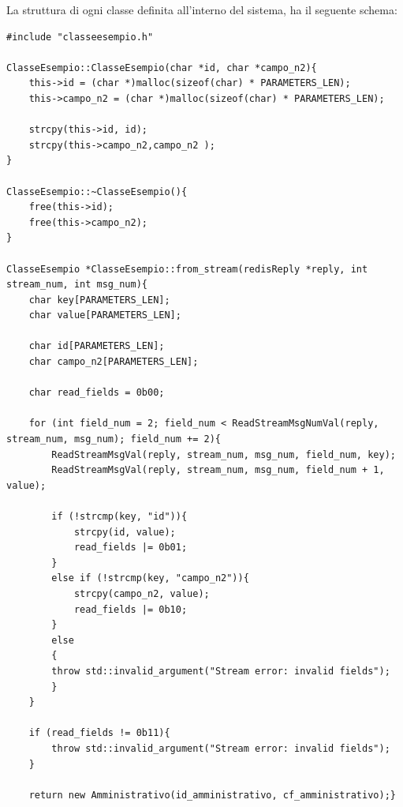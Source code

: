 \documentclass[12pt]{report}
\begin{document}
    La struttura di ogni classe definita all'interno del sistema, ha il seguente schema:
    \begin{lstlisting}
#include "classeesempio.h"

ClasseEsempio::ClasseEsempio(char *id, char *campo_n2){
    this->id = (char *)malloc(sizeof(char) * PARAMETERS_LEN);
    this->campo_n2 = (char *)malloc(sizeof(char) * PARAMETERS_LEN);

    strcpy(this->id, id);
    strcpy(this->campo_n2,campo_n2 );
}

ClasseEsempio::~ClasseEsempio(){
    free(this->id);
    free(this->campo_n2);
}

ClasseEsempio *ClasseEsempio::from_stream(redisReply *reply, int stream_num, int msg_num){
    char key[PARAMETERS_LEN];
    char value[PARAMETERS_LEN];

    char id[PARAMETERS_LEN];
    char campo_n2[PARAMETERS_LEN];

    char read_fields = 0b00;

    for (int field_num = 2; field_num < ReadStreamMsgNumVal(reply, stream_num, msg_num); field_num += 2){
        ReadStreamMsgVal(reply, stream_num, msg_num, field_num, key);
        ReadStreamMsgVal(reply, stream_num, msg_num, field_num + 1, value);

        if (!strcmp(key, "id")){
            strcpy(id, value);
            read_fields |= 0b01;
        }
        else if (!strcmp(key, "campo_n2")){
            strcpy(campo_n2, value);
            read_fields |= 0b10;
        }
        else
        {
        throw std::invalid_argument("Stream error: invalid fields");
        }
    }

    if (read_fields != 0b11){
        throw std::invalid_argument("Stream error: invalid fields");
    }

    return new Amministrativo(id_amministrativo, cf_amministrativo);}
    \end{lstlisting}
\end{document}
